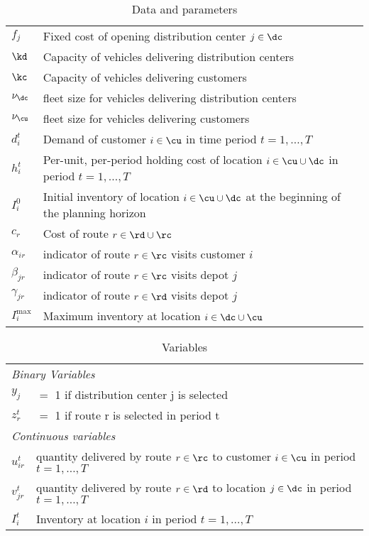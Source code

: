 \documentclass[a4paper,10pt]{article}
\begin{document}
\begin{linenumbers}
\begin{table}[htbp] 
	\centering
	\begin{tabular}{ll}
		\toprule
         $f_j$ & Fixed cost of opening distribution center $j\in\dc$\\ 
        $\kd$ & Capacity of vehicles delivering distribution centers\\ 
        $\kc$ & Capacity of vehicles delivering customers\\ 
        $\nu_{\dc}$ & fleet size for vehicles delivering distribution centers\\ 
        $\nu_{\cu}$ & fleet size for vehicles delivering customers\\ 
        $d^t_i$ & Demand of customer $i\in\cu$ in time period $t=1,\ldots,T$\\
        $h^t_i$ & Per-unit, per-period holding cost of location $i\in\cu\cup\dc$ in period $t=1,\ldots, T$\\
        $I_i^0$ & Initial inventory of location $i\in \cu\cup\dc$ at the beginning of the planning horizon\\
        $c_r$ & Cost of route $r\in \rd\cup\rc$\\
        $\alpha_{ir}$ & indicator of route $r\in\rc$ visits customer $i$\\
        $\beta_{jr}$ & indicator of route $r\in\rc$ visits depot $j$\\
        $\gamma_{jr}$ & indicator of route $r\in\rd$ visits depot $j$\\
        $I_i^{\max}$ & Maximum inventory at location $i\in\dc\cup\cu$\\
         \bottomrule
     \end{tabular}
\caption{Data and parameters}
\label{tab:data}
\end{table}

\begin{table} 
\centering
\begin{tabular}{ll}
	\toprule       
    \multicolumn{2}{l}{\textit{Binary Variables}}\\
    $y_j$ & $=$ 1 if distribution center j is selected \\
    $z^t_r$ & $=$ 1 if route r is selected in period t\\
    \midrule
    \multicolumn{2}{l}{\textit{Continuous variables}}\\
    $u^t_{ir}$ &  quantity delivered by route $r\in\rc$ to customer $i\in\cu$ in period $t=1,\ldots,T$\\
    $v^t_{jr}$ &  quantity delivered by route $r\in\rd$ to location $j\in\dc$ in period $t=1,\ldots,T$\\
    $I^t_i$ &  Inventory at location $i$ in period $t=1,\ldots,T$\\
    \bottomrule
   \end{tabular}
\caption{Variables}
\label{tab:var}
\end{table}


\end{linenumbers}
\end{document}
